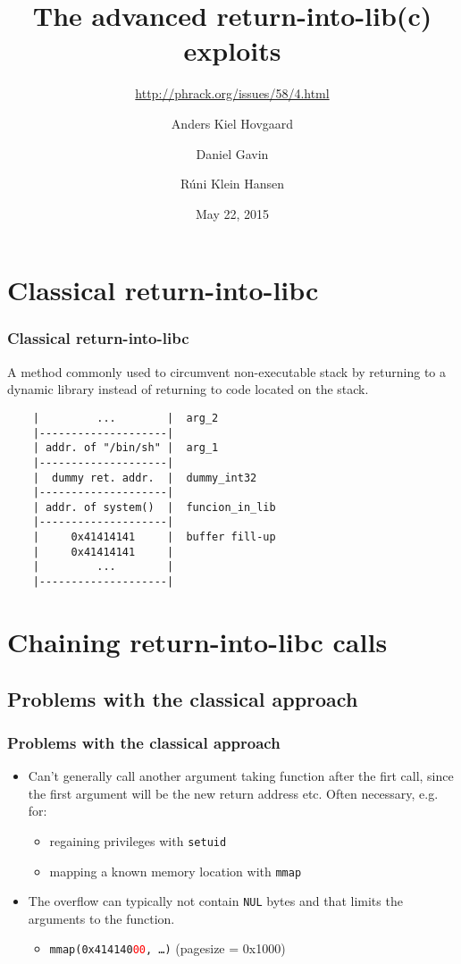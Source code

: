 \documentclass{beamer}
\title{The advanced return-into-lib(c) exploits}
\subtitle{\url{http://phrack.org/issues/58/4.html}}
\author{Anders Kiel Hovgaard \and Daniel Gavin \and Rúni Klein Hansen}
\institute{Department of Computer Science, University of Copenhagen}
\date{May 22, 2015}
\begin{document}
\frame{\titlepage}

\section{Classical return-into-libc}

\begin{frame}[fragile]
  \frametitle{Classical return-into-libc}

  A method commonly used to circumvent non-executable stack by returning to a
  dynamic library instead of returning to code located on the stack.

  \begin{verbatim}
    |         ...        |  arg_2
    |--------------------|
    | addr. of "/bin/sh" |  arg_1
    |--------------------|
    |  dummy ret. addr.  |  dummy_int32
    |--------------------|
    | addr. of system()  |  funcion_in_lib
    |--------------------|
    |     0x41414141     |  buffer fill-up
    |     0x41414141     |
    |         ...        |
    |--------------------|
  \end{verbatim}
\end{frame}


\section{Chaining return-into-libc calls} %

\subsection{Problems with the classical approach}

\begin{frame}
  \frametitle{Problems with the classical approach}
  \begin{itemize}
    \item Can't generally call another argument taking function after the firt
      call, since the first argument will be the new return address etc.
      Often necessary, e.g. for:
      \begin{itemize}
        \item regaining privileges with \texttt{setuid}
        \item mapping a known memory location with \texttt{mmap}
      \end{itemize}

    \item The overflow can typically not contain \texttt{NUL} bytes and that
      limits the arguments to the function.
      \begin{itemize}
        \item \texttt{mmap(0x414140\textcolor{red}{00}, \dots)} \hfill
          (pagesize = 0x1000)
      \end{itemize}
  \end{itemize}
\end{frame}
\end{document}
